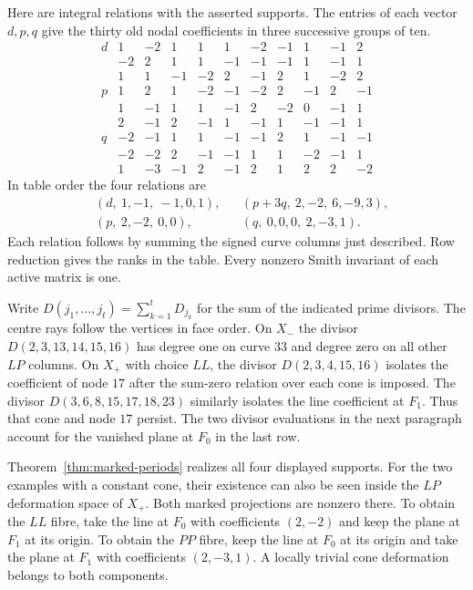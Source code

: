 Here are integral relations with the asserted supports. The entries
of each vector $d,p,q$ give the thirty old nodal coefficients in
three successive groups of ten.
\[
\begin{array}{c|*{10}{r}}
d&1&-2&1&1&1&-2&-1&1&-1&2\\
 &-2&2&1&1&-1&-1&-1&1&-1&1\\
 &1&1&-1&-2&2&-1&2&1&-2&2\\[2pt]
p&1&2&1&-2&-1&-2&2&-1&2&-1\\
 &1&-1&1&1&-1&2&-2&0&-1&1\\
 &2&-1&2&-1&1&-1&1&-1&-1&1\\[2pt]
q&-2&-1&1&1&-1&-1&2&1&-1&-1\\
 &-2&-2&2&-1&-1&1&1&-2&-1&1\\
 &1&-3&-1&2&-1&2&1&2&2&-2
\end{array}
\]
In table order the four relations are
\[
\begin{aligned}
 &(d,\ 1,-1,\ -1,0,1),&& (p+3q,\ 2,-2,\ 6,-9,3),\\
 &(p,\ 2,-2,\ 0,0),&& (q,\ 0,0,0,\ 2,-3,1).
\end{aligned}
\]
Each relation follows by summing the signed curve columns just
described. Row reduction gives the ranks in the table. Every nonzero
Smith invariant of each active matrix is one.

Write $D(j_1,\ldots,j_t)=\sum_{k=1}^tD_{j_k}$ for the sum of the
indicated prime divisors. The centre rays follow the vertices in face
order. On $X_-$ the divisor $D(2,3,13,14,15,16)$ has degree one on
curve $33$ and degree zero on all other $LP$ columns.
On $X_+$ with choice $LL$, the divisor $D(2,3,4,15,16)$ isolates
the coefficient of node $17$ after the sum-zero relation over
each cone is imposed. The divisor $D(3,6,8,15,17,18,23)$ similarly
isolates the line coefficient at $F_1$. Thus that cone and node
$17$ persist. The two divisor evaluations in the next paragraph
account for the vanished plane at $F_0$ in the last row.

Theorem~\ref{thm:marked-periods} realizes all four displayed
supports. For the two examples with a constant cone, their existence
can also be seen inside the $LP$ deformation space of $X_+$.
Both marked projections are nonzero there. To obtain the $LL$ fibre,
take the line at $F_0$ with coefficients $(2,-2)$ and keep the
plane at $F_1$ at its origin. To obtain the $PP$ fibre, keep the
line at $F_0$ at its origin and take the plane at $F_1$ with
coefficients $(2,-3,1)$. A locally trivial cone deformation belongs
to both components.


